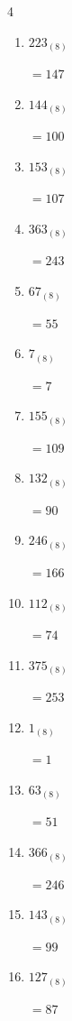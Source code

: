 \begin{multicols}{4}
\begin{enumerate}
        $=90$

  \item $223_{(8)}$

        $=147$

  \item $144_{(8)}$

        $=100$

  \item $153_{(8)}$

        $=107$

  \item $363_{(8)}$

        $=243$

  \item $67_{(8)}$

        $=55$

  \item $7_{(8)}$

        $=7$

  \item $155_{(8)}$

        $=109$

\columnbreak %

  \item $132_{(8)}$

        $=90$

  \item $246_{(8)}$

        $=166$

  \item $112_{(8)}$

        $=74$

  \item $375_{(8)}$

        $=253$

  \item $1_{(8)}$

        $=1$

  \item $63_{(8)}$

        $=51$

  \item $366_{(8)}$

        $=246$

  \item $143_{(8)}$

        $=99$

  \item $127_{(8)}$

        $=87$


\end{enumerate}
\end{multicols}
